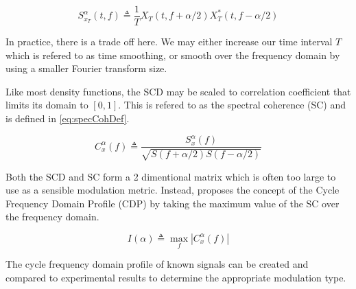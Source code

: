 \begin{equation}
S_{x_T}^{\alpha}(t,f) \triangleq \frac{1}{T} X_T(t,f + \alpha / 2)X_T^*(t,f - \alpha / 2)
\label{eq:ScdDefined2}
\end{equation}

In practice, there is a trade off here.  We may either increase our time
interval $T$ which is refered to as time smoothing, or smooth over the frequency
domain by using a smaller Fourier transform size.

Like most density functions, the SCD may be scaled to correlation
coefficient that limits its domain to $[0,1]$. This is refered to as the
spectral coherence (SC) and is defined in \ref{eq:specCohDef}.

\begin{equation}
C_{x}^{\alpha}(f) \triangleq \frac{S_x^{\alpha}(f)}{\sqrt{S(f+\alpha/2)S(f-\alpha/2)}}
\label{eq:specCohDef}
\end{equation}


Both the SCD and SC form a 2 dimentional matrix which is often
too large to use as a sensible modulation metric.  Instead, \cite{kim2007}
proposes the concept of the Cycle Frequency Domain Profile (CDP) by taking the
maximum value of the SC over the frequency domain.

\begin{equation}
I(\alpha) \triangleq \max_f |C_x^{\alpha}(f)|
\label{eq:CdpDef}
\end{equation}

The cycle frequency domain profile of known signals can be created and compared
to experimental results to determine the appropriate modulation type.


